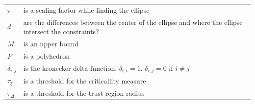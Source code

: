 \documentclass{article}
\theoremstyle{case}
\begin{document}
\begin{longtable}{| p{} | p{} |}
$\pi$ & is a scaling factor while finding the ellipse \\
$d$ & are the differences between the center of the ellipse and where the ellipse intersect the constraints? \\
$M$ & is an upper bound \\
$P$ & is a polyhedron \\
$\delta_{i,j}$ & is the kronecker delta function, $\delta_{i,i} = 1$, $\delta_{i,j} = 0$ if $i\ne j$ \\
$\tau_{\xi}$ & is a threshold for the criticallity measure \\
$\tau_{\Delta}$ & is a threshold for the trust region radius
\label{tab:TableOfNotation}
\end{longtable}

\newpage




\end{document}

